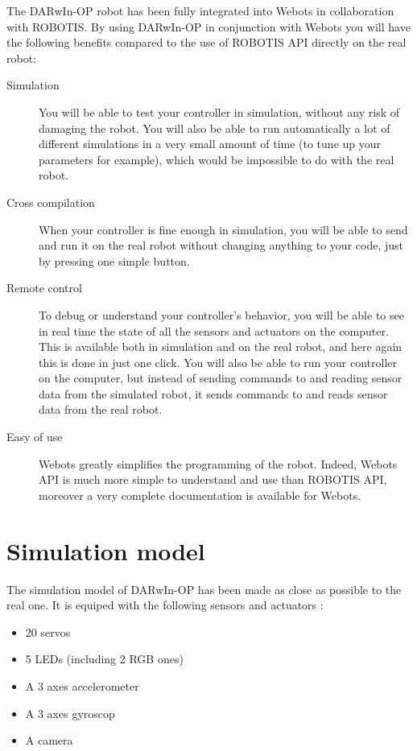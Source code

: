 \documentclass[a4paper, 12pt]{article}  		%
\begin{document}
The DARwIn-OP robot has been fully integrated into Webots in collaboration with ROBOTIS. By using DARwIn-OP in conjunction with Webots you will have the following benefits compared to the use of ROBOTIS API directly on the real robot:
\begin{description}
\item[Simulation ] You will be able to test your controller in simulation, without any risk of damaging the robot. You will also be able to run automatically a lot of different simulations in a very small amount of time (to tune up your parameters for example), which would be impossible to do with the real robot.
\item[Cross compilation ] When your controller is fine enough in simulation, you will be able to send and run it on the real robot without changing anything to your code, just by pressing one simple button.
\item[Remote control ] To debug or understand your controller's behavior, you will be able to see in real time the state of all the sensors and actuators on the computer. This is available both in simulation and on the real robot, and here again this is done in just one click. You will also be able to run your controller on the computer, but instead of sending commands to and reading sensor data from the simulated robot, it sends commands to and reads sensor data from the real robot.
\item[Easy of use ] Webots greatly simplifies the programming of the robot. Indeed, Webots API is much more simple to understand and use than ROBOTIS API, moreover a very complete documentation is available for Webots.
\end{description}


\newpage
\section{Simulation model}

The simulation model of DARwIn-OP has been made as close as possible to the real one. It is equiped with the following sensors and actuators :
\begin{itemize}
\item 20 servos
\item 5 LEDs (including 2 RGB ones)
\item A 3 axes accelerometer
\item A 3 axes gyroscop
\item A camera
\end{itemize}
\end{document}
